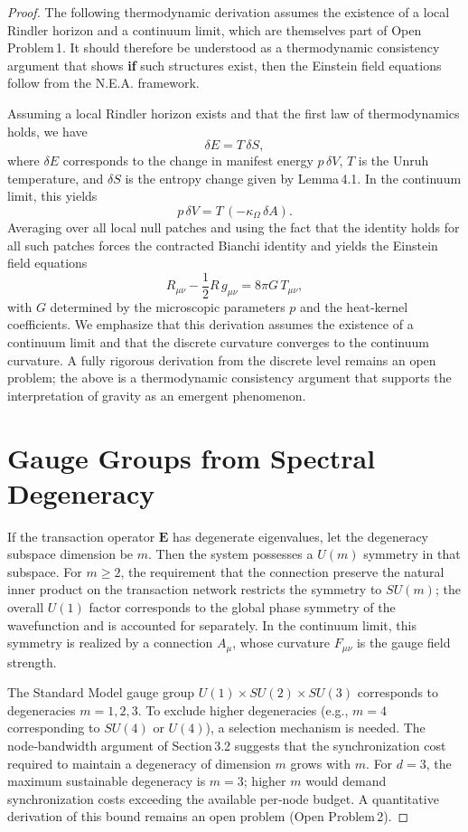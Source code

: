 \documentclass{article}
\begin{document}
\begin{proof}
The following thermodynamic derivation assumes the existence of a local Rindler horizon and a continuum limit, which are themselves part of Open Problem 1. It should therefore be understood as a thermodynamic consistency argument that shows \textbf{if} such structures exist, then the Einstein field equations follow from the N.E.A. framework.

Assuming a local Rindler horizon exists and that the first law of thermodynamics holds, we have
\[
\delta E = T\,\delta S,
\]
where $\delta E$ corresponds to the change in manifest energy $p\,\delta V$, $T$ is the Unruh temperature, and $\delta S$ is the entropy change given by Lemma 4.1. In the continuum limit, this yields
\[
p\,\delta V = T\,(-\kappa_\Omega\,\delta A).
\]
Averaging over all local null patches and using the fact that the identity holds for all such patches forces the contracted Bianchi identity and yields the Einstein field equations
\[
R_{\mu\nu} - \frac12 R\,g_{\mu\nu} = 8\pi G\,T_{\mu\nu},
\]
with $G$ determined by the microscopic parameters $p$ and the heat‑kernel coefficients. We emphasize that this derivation assumes the existence of a continuum limit and that the discrete curvature converges to the continuum curvature. A fully rigorous derivation from the discrete level remains an open problem; the above is a thermodynamic consistency argument that supports the interpretation of gravity as an emergent phenomenon.

\section{Gauge Groups from Spectral Degeneracy}
If the transaction operator $\mathbf{E}$ has degenerate eigenvalues, let the degeneracy subspace dimension be $m$. Then the system possesses a $U(m)$ symmetry in that subspace. For $m \ge 2$, the requirement that the connection preserve the natural inner product on the transaction network restricts the symmetry to $SU(m)$; the overall $U(1)$ factor corresponds to the global phase symmetry of the wavefunction and is accounted for separately. In the continuum limit, this symmetry is realized by a connection $A_\mu$, whose curvature $F_{\mu\nu}$ is the gauge field strength.

The Standard Model gauge group $U(1) \times SU(2) \times SU(3)$ corresponds to degeneracies $m=1,2,3$. To exclude higher degeneracies (e.g., $m=4$ corresponding to $SU(4)$ or $U(4)$), a selection mechanism is needed. The node‑bandwidth argument of Section 3.2 suggests that the synchronization cost required to maintain a degeneracy of dimension $m$ grows with $m$. For $d=3$, the maximum sustainable degeneracy is $m=3$; higher $m$ would demand synchronization costs exceeding the available per‑node budget. A quantitative derivation of this bound remains an open problem (Open Problem 2).


\end{proof}
\end{document}
